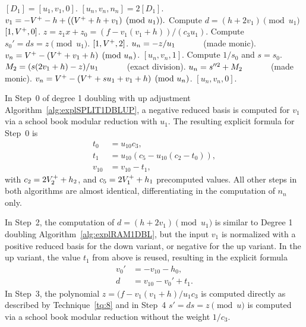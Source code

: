 \begin{algorithm}[htbp]
\caption{Genus 2 Split Model Degree 1 Doubling with Up Adjustment\label{alg:explSPLIT1DBLUP}}
\begin{algorithmic} [1]
\Require $[D_1] = [u_1,v_1, 0]$.  \smallskip
\Ensure $[u_n,v_n,n_n] = 2[D_1]$.
\algrule
\setcounter{ALG@line}{-1}
\State $v_1 = -V^{+} - h + ((V^{+} + h + v_1) \pmod{u_1}).$ 
\State Compute $d = (h + 2v_1) \pmod{u_1}$
 \Return $[1,V^{+},0]$.
\EndIf
\State $z = z_1x + z_0 = (f- v_1(v_1 + h))/(c_3u_1).$
\State Compute $s_0' = ds =  z \pmod{u_1}$.
     \Return $[1,V^{+},2]$.
    \EndIf
    \State $u_n = -z/u_1\quad\quad\quad$ (made monic).
    \State $v_n = V^{+} - (V^{+} + v_1 + h) \pmod{u_n}$.
    \State \Return $[u_n,v_n,1]$.
\EndIf
\State Compute $1/s_0$ and $s = s_0$.
\State $M_2 = (s(2v_1 + h) - z)/u_1 \quad\quad\quad$ (exact division).
\State $u_n = s^{\prime \prime 2} + M_2 \quad\quad\quad$ (made monic).
\State $v_n = V^{+} - (V^{+} + su_1 + v_1 + h) \pmod{u_n}$.
\State \Return $[u_n,v_n,0]$.
\end{algorithmic}
\end{algorithm}

In Step~0 of degree 1 doubling with up adjustment
Algorithm~\ref{alg:explSPLIT1DBLUP}, a negative reduced basis is computed for
$v_1$ via a school book modular reduction with $u_1$. The resulting explicit formula for
Step~0 is 
\begin{align*}
    t_0 &= u_{10}c_3,\\
    t_1 &= u_{10}(c_5 - u_{10}(c_2 - t_0)),\\
    v_{10} &= v_{10} - t_1,
\end{align*} with $c_2 = 2V^{+}_2 + h_2$, and $c_5 = 2V^{+}_1 + h_1$ 
precomputed values.  All other steps in both algorithms are almost identical,
differentiating in the computation of $n_n$ only.

In Step~2, the computation of $d = (h + 2v_1) \pmod{u_1}$ is similar to Degree 1 doubling
Algorithm~\ref{alg:explRAM1DBL}, but the input $v_1$ is normalized with a
positive reduced basis for the down variant, or negative for the up variant. In
the up variant, the value $t_1$ from above is reused, resulting in
the explicit formula
\begin{align*}
    v_0' &= -v_{10} - h_0,\\
    d    &= v_{10} - v_0' + t_1.
\end{align*}
In Step~3, the polynomial $z = (f - v_1(v_1 + h)/u_1c_3$ is computed directly as
described by Technique~\ref{tq:8} and in Step~4 $s'= ds = z \pmod{u}$ is
computed via a school book modular reduction without the weight  $1/c_3$. 

